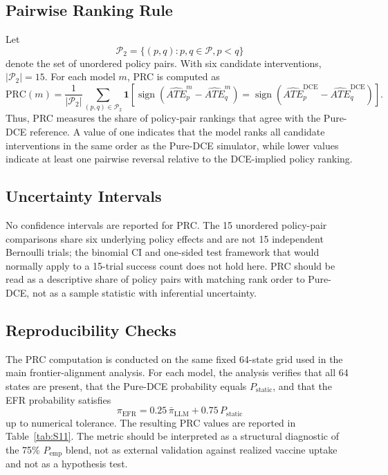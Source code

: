 \documentclass[11pt]{article}
\begin{document}
\subsection{Pairwise Ranking Rule}

Let
\[
\mathcal{P}_2
=
\{(p,q): p,q\in\mathcal{P}, p<q\}
\]
denote the set of unordered policy pairs. With six candidate interventions, \(|\mathcal{P}_2|=15\). For each model \(m\), PRC is computed as
\[
\mathrm{PRC}(m)
=
\frac{1}{|\mathcal{P}_2|}
\sum_{(p,q)\in\mathcal{P}_2}
\mathbf{1}
\left[
\operatorname{sign}\!\left(
\widehat{ATE}^{m}_{p}
-
\widehat{ATE}^{m}_{q}
\right)
=
\operatorname{sign}\!\left(
\widehat{ATE}^{\mathrm{DCE}}_{p}
-
\widehat{ATE}^{\mathrm{DCE}}_{q}
\right)
\right].
\]
Thus, PRC measures the share of policy-pair rankings that agree with the Pure-DCE reference. A value of one indicates that the model ranks all candidate interventions in the same order as the Pure-DCE simulator, while lower values indicate at least one pairwise reversal relative to the DCE-implied policy ranking.

\subsection{Uncertainty Intervals}

No confidence intervals are reported for PRC. The 15 unordered policy-pair comparisons share six underlying policy effects and are not 15 independent Bernoulli trials; the binomial CI and one-sided test framework that would normally apply to a 15-trial success count does not hold here. PRC should be read as a descriptive share of policy pairs with matching rank order to Pure-DCE, not as a sample statistic with inferential uncertainty.

\subsection{Reproducibility Checks}

The PRC computation is conducted on the same fixed 64-state grid used in the main frontier-alignment analysis. For each model, the analysis verifies that all 64 states are present, that the Pure-DCE probability equals \(P_{\mathrm{static}}\), and that the EFR probability satisfies
\[
\pi_{\mathrm{EFR}}
=
0.25\,\bar{\pi}_{\mathrm{LLM}}
+
0.75\,P_{\mathrm{static}}
\]
up to numerical tolerance. The resulting PRC values are reported in Table~\ref{tab:S11}. The metric should be interpreted as a structural diagnostic of the 75\% $P_{\text{emp}}$ blend, not as external validation against realized vaccine uptake and not as a hypothesis test.
\end{document}
